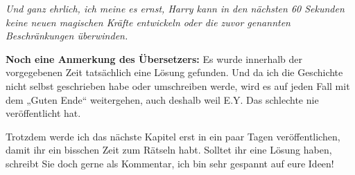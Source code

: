 \emph{Und ganz ehrlich, ich meine es ernst, Harry kann in den nächsten 60 Sekunden keine neuen magischen Kräfte entwickeln oder die zuvor genannten Beschränkungen überwinden.}

\textbf{Noch eine Anmerkung des Übersetzers:}
Es wurde innerhalb der vorgegebenen Zeit tatsächlich eine Lösung gefunden. Und
da ich die Geschichte nicht selbst geschrieben habe oder umschreiben werde, wird
es auf jeden Fall mit dem „Guten Ende“ weitergehen, auch deshalb weil E.Y. Das
schlechte nie veröffentlicht hat.

Trotzdem werde ich das nächste Kapitel erst in ein paar Tagen veröffentlichen,
damit ihr ein bisschen Zeit zum Rätseln habt. Solltet ihr eine Lösung haben,
schreibt Sie doch gerne als Kommentar, ich bin sehr gespannt auf eure Ideen!

